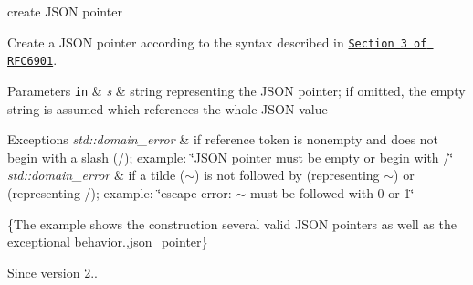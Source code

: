 create J\-S\-O\-N pointer 

Create a J\-S\-O\-N pointer according to the syntax described in \href{https://tools.ietf.org/html/rfc6901#section-3}{\tt Section 3 of R\-F\-C6901}.


\begin{DoxyParams}[1]{Parameters}
\mbox{\tt in}  & {\em s} & string representing the J\-S\-O\-N pointer; if omitted, the empty string is assumed which references the whole J\-S\-O\-N value\\
\hline
\end{DoxyParams}

\begin{DoxyExceptions}{Exceptions}
{\em std\-::domain\-\_\-error} & if reference token is nonempty and does not begin with a slash ({\ttfamily /}); example\-: {\ttfamily \char`\"{}\-J\-S\-O\-N pointer must be empty or
begin with /\char`\"{}} \\
\hline
{\em std\-::domain\-\_\-error} & if a tilde ({\ttfamily $\sim$}) is not followed by {} (representing {\ttfamily $\sim$}) or {} (representing {\ttfamily /}); example\-: {\ttfamily \char`\"{}escape error\-:
$\sim$ must be followed with 0 or 1\char`\"{}}\\
\hline
\end{DoxyExceptions}
\{The example shows the construction several valid J\-S\-O\-N pointers as well as the exceptional behavior.,\hyperlink{classnlohmann_1_1basic__json_1_1json__pointer}{json\-\_\-pointer}\}

\begin{DoxySince}{Since}
version 2.. 
\end{DoxySince}


